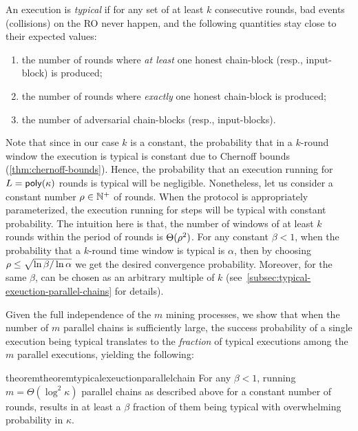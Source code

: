 \begin{definition}
    \label{def:typical-informal}

    An execution is \emph{typical} if for any set of at least $k$ consecutive rounds,  bad events (collisions) on the RO never happen, and the following quantities stay close to their expected values:
    \begin{enumerate}[label=(\alph*), leftmargin=*, nosep]
        \item the number of rounds where \emph{at least} one honest chain-block (resp., input-block) is produced;
        \item the number of rounds where \emph{exactly} one honest chain-block is produced;
        \item the number of adversarial chain-blocks (resp., input-blocks).
    \end{enumerate}
\end{definition}

Note that since in our case $k$ is a constant, the probability that in a $k$-round window the execution is typical is constant due to Chernoff bounds (\cref{thm:chernoff-bounds}).
%
Hence, the probability that an execution running for $L = \mathsf{poly}(\kappa)$ rounds is typical will be negligible.
%
Nonetheless, let us consider a constant number $\rho \in \mathbb{N}^+$ of rounds.
%
When the protocol is appropriately parameterized, the execution running for \phaseLength steps will be typical with constant probability.
%
The intuition here is that, the number of windows of at least $k$ rounds within the period of \phaseLength rounds is $\Theta(\rho^2)$.
%
For any constant $\beta < 1$, when the probability that a $k$-round time window is typical is $\alpha$, then by choosing $\rho \le \sqrt{\ln \beta / \ln \alpha}$ we get the desired convergence probability.
%
Moreover, for the same $\beta$, \phaseLength can be chosen as an arbitrary multiple of $k$ (see~\cref{subsec:typical-exeuction-parallel-chains} for details).

Given the full independence of the $m$ mining processes, we show that when the number of $m$ parallel chains is sufficiently large, the success probability of a single execution being typical translates to the \emph{fraction} of typical executions among the $m$ parallel executions, yielding the following:

\begin{restatable}{theorem}{theoremtypicalexeuctionparallelchain}
    \label{thm:typical-execution-parallel-chain}
    For any $\beta < 1$, running $m = \Theta(\log^2 \kappa)$ parallel chains as described above for a constant number \phaseLength of rounds, results in at least a $\beta$ fraction of them being typical with overwhelming probability in $\kappa$.
\end{restatable}

